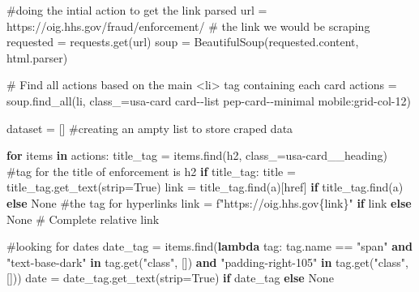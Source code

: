 \documentclass[
  letterpaper,
  DIV=11,
  numbers=noendperiod]{scrartcl}
\newenvironment{Shaded}{\begin{snugshade}}{\end{snugshade}}
\newcommand{\CommentTok}[1]{\textcolor[rgb]{0.37,0.37,0.37}{#1}}
\newcommand{\ControlFlowTok}[1]{\textcolor[rgb]{0.00,0.23,0.31}{\textbf{#1}}}
\newcommand{\KeywordTok}[1]{\textcolor[rgb]{0.00,0.23,0.31}{\textbf{#1}}}
\newcommand{\NormalTok}[1]{\textcolor[rgb]{0.00,0.23,0.31}{#1}}
\newcommand{\OperatorTok}[1]{\textcolor[rgb]{0.37,0.37,0.37}{#1}}
\newcommand{\SpecialCharTok}[1]{\textcolor[rgb]{0.37,0.37,0.37}{#1}}
\newcommand{\SpecialStringTok}[1]{\textcolor[rgb]{0.13,0.47,0.30}{#1}}
\newcommand{\StringTok}[1]{\textcolor[rgb]{0.13,0.47,0.30}{#1}}
\newcommand{\VariableTok}[1]{\textcolor[rgb]{0.07,0.07,0.07}{#1}}
\begin{document}
\begin{Shaded}
\begin{Highlighting}[]
\CommentTok{\#doing the intial action to get the link parsed}
\NormalTok{url }\OperatorTok{=} \StringTok{\textquotesingle{}https://oig.hhs.gov/fraud/enforcement/\textquotesingle{}} \CommentTok{\# the link we would be scraping}
\NormalTok{requested }\OperatorTok{=}\NormalTok{ requests.get(url) }
\NormalTok{soup }\OperatorTok{=}\NormalTok{ BeautifulSoup(requested.content, }\StringTok{\textquotesingle{}html.parser\textquotesingle{}}\NormalTok{)}

\CommentTok{\# Find all actions based on the main \textless{}li\textgreater{} tag containing each card}
\NormalTok{actions }\OperatorTok{=}\NormalTok{ soup.find\_all(}\StringTok{\textquotesingle{}li\textquotesingle{}}\NormalTok{, class\_}\OperatorTok{=}\StringTok{\textquotesingle{}usa{-}card card{-}{-}list pep{-}card{-}{-}minimal mobile:grid{-}col{-}12\textquotesingle{}}\NormalTok{)}

\NormalTok{dataset }\OperatorTok{=}\NormalTok{ [] }\CommentTok{\#creating an ampty list to store craped data}

\ControlFlowTok{for}\NormalTok{ items }\KeywordTok{in}\NormalTok{ actions:}
\NormalTok{    title\_tag }\OperatorTok{=}\NormalTok{ items.find(}\StringTok{\textquotesingle{}h2\textquotesingle{}}\NormalTok{, class\_}\OperatorTok{=}\StringTok{\textquotesingle{}usa{-}card\_\_heading\textquotesingle{}}\NormalTok{) }\CommentTok{\#tag for the title of enforcement is h2}
    \ControlFlowTok{if}\NormalTok{ title\_tag:}
\NormalTok{        title }\OperatorTok{=}\NormalTok{ title\_tag.get\_text(strip}\OperatorTok{=}\VariableTok{True}\NormalTok{)  }
\NormalTok{        link }\OperatorTok{=}\NormalTok{ title\_tag.find(}\StringTok{\textquotesingle{}a\textquotesingle{}}\NormalTok{)[}\StringTok{\textquotesingle{}href\textquotesingle{}}\NormalTok{] }\ControlFlowTok{if}\NormalTok{ title\_tag.find(}\StringTok{\textquotesingle{}a\textquotesingle{}}\NormalTok{) }\ControlFlowTok{else} \VariableTok{None} \CommentTok{\#the tag for hyperlinks}
\NormalTok{        link }\OperatorTok{=} \SpecialStringTok{f"https://oig.hhs.gov}\SpecialCharTok{\{}\NormalTok{link}\SpecialCharTok{\}}\SpecialStringTok{"} \ControlFlowTok{if}\NormalTok{ link }\ControlFlowTok{else} \VariableTok{None}  \CommentTok{\# Complete relative link}

    \CommentTok{\#looking for dates}
\NormalTok{    date\_tag }\OperatorTok{=}\NormalTok{ items.find(}\KeywordTok{lambda}\NormalTok{ tag: tag.name }\OperatorTok{==} \StringTok{"span"} \KeywordTok{and} \StringTok{"text{-}base{-}dark"} \KeywordTok{in}\NormalTok{ tag.get(}\StringTok{"class"}\NormalTok{, []) }\KeywordTok{and} \StringTok{"padding{-}right{-}105"} \KeywordTok{in}\NormalTok{ tag.get(}\StringTok{"class"}\NormalTok{, []))}
\NormalTok{    date }\OperatorTok{=}\NormalTok{ date\_tag.get\_text(strip}\OperatorTok{=}\VariableTok{True}\NormalTok{) }\ControlFlowTok{if}\NormalTok{ date\_tag }\ControlFlowTok{else} \VariableTok{None}


\end{Highlighting}
\end{Shaded}
\end{document}
